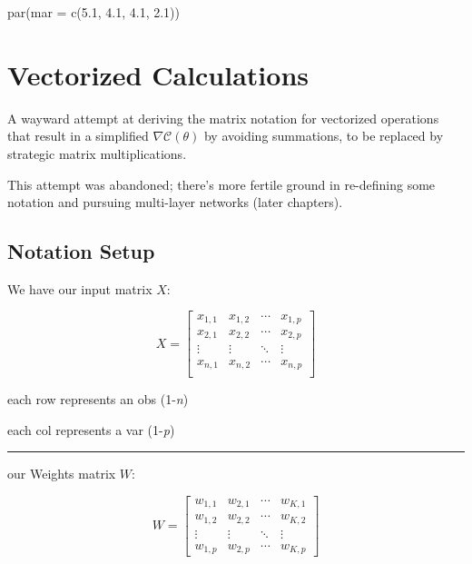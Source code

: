 \documentclass[
]{book}
\newenvironment{Shaded}{\begin{snugshade}}{\end{snugshade}}
\newcommand{\AttributeTok}[1]{\textcolor[rgb]{0.77,0.63,0.00}{#1}}
\newcommand{\FloatTok}[1]{\textcolor[rgb]{0.00,0.00,0.81}{#1}}
\newcommand{\FunctionTok}[1]{\textcolor[rgb]{0.00,0.00,0.00}{#1}}
\newcommand{\NormalTok}[1]{#1}
\begin{document}
\begin{Shaded}
\begin{Highlighting}[]
\FunctionTok{par}\NormalTok{(}\AttributeTok{mar =} \FunctionTok{c}\NormalTok{(}\FloatTok{5.1}\NormalTok{, }\FloatTok{4.1}\NormalTok{, }\FloatTok{4.1}\NormalTok{, }\FloatTok{2.1}\NormalTok{))}
\end{Highlighting}
\end{Shaded}

\hypertarget{vectorized-calculations}{%
\section{Vectorized Calculations}\label{vectorized-calculations}}

A wayward attempt at deriving the matrix notation for vectorized operations that result in a simplified \(\nabla \mathcal{C}(\theta)\) by avoiding summations, to be replaced by strategic matrix multiplications.

This attempt was abandoned; there's more fertile ground in re-defining some notation and pursuing multi-layer networks (later chapters).

\hypertarget{notation-setup}{%
\subsection{Notation Setup}\label{notation-setup}}

We have our input matrix \(X\):

\[
X = 
\begin{bmatrix}
x_{1, 1} & x_{1, 2} & \cdots & x_{1, p} \\
x_{2, 1} & x_{2, 2} & \cdots & x_{2, p} \\
\vdots & \vdots & \ddots & \vdots \\
x_{n, 1} & x_{n, 2} & \cdots & x_{n, p} \\
\end{bmatrix}
\]

each row represents an obs (1-\emph{n})

each col represents a var (1-\emph{p})

\begin{center}\rule{0.5\linewidth}{0.5pt}\end{center}

our Weights matrix \(W\):

\[
W =
\begin{bmatrix}
w_{1, 1} & w_{2, 1} & \cdots & w_{K, 1} \\
w_{1, 2} & w_{2, 2} & \cdots & w_{K, 2} \\
\vdots & \vdots & \ddots & \vdots \\
w_{1, p} & w_{2, p} & \cdots & w_{K, p}
\end{bmatrix}
\]
\end{document}
